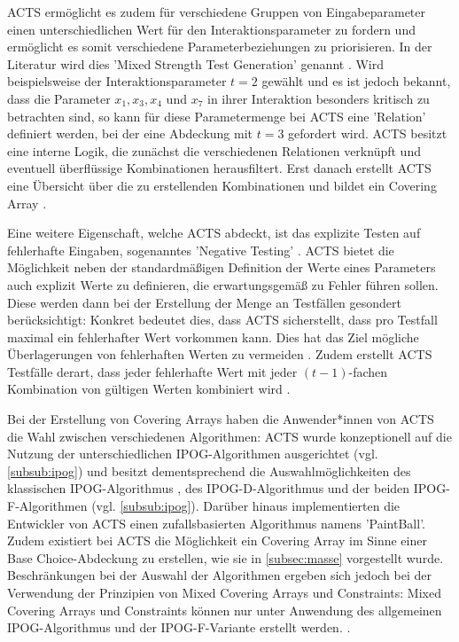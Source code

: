 ACTS ermöglicht es zudem für verschiedene Gruppen von Eingabeparameter einen unterschiedlichen Wert für den Interaktionsparameter zu fordern und ermöglicht es somit verschiedene Parameterbeziehungen zu priorisieren. In der Literatur wird dies 'Mixed Strength Test Generation' genannt \cite{yu2013acts, czerwonka2006pairwise}. Wird beispielsweise der Interaktionsparameter $t = 2$ gewählt und es ist jedoch bekannt, dass die Parameter $x_1, x_3, x_4$ und $x_7$ in ihrer Interaktion besonders kritisch zu betrachten sind, so kann für diese Parametermenge bei ACTS eine 'Relation' \cite{yu2013acts} definiert werden, bei der eine Abdeckung mit $t = 3$ gefordert wird. ACTS besitzt eine interne Logik, die zunächst die verschiedenen Relationen verknüpft und eventuell überflüssige Kombinationen herausfiltert. Erst danach erstellt ACTS eine Übersicht über die zu erstellenden Kombinationen und bildet ein Covering Array \cite{yu2013acts}.

Eine weitere Eigenschaft, welche ACTS abdeckt, ist das explizite Testen auf fehlerhafte Eingaben, sogenanntes 'Negative Testing' \cite{acts_user_guide}. ACTS bietet die Möglichkeit neben der standardmäßigen Definition der Werte eines Parameters auch explizit Werte zu definieren, die erwartungsgemäß zu Fehler führen sollen. Diese werden dann bei der Erstellung der Menge an Testfällen gesondert berücksichtigt: Konkret bedeutet dies, dass ACTS sicherstellt, dass pro Testfall maximal ein fehlerhafter Wert vorkommen kann. Dies hat das Ziel mögliche Überlagerungen von fehlerhaften Werten zu vermeiden \cite{acts_user_guide}. Zudem erstellt ACTS Testfälle derart, dass jeder fehlerhafte Wert mit jeder $(t-1)$-fachen Kombination von gültigen Werten kombiniert wird \cite{acts_user_guide}.
  
Bei der Erstellung von Covering Arrays haben die Anwender*innen von ACTS die Wahl zwischen verschiedenen Algorithmen: ACTS wurde konzeptionell auf die Nutzung der unterschiedlichen IPOG-Algorithmen ausgerichtet (vgl. \autoref{subsub:ipog}) und besitzt dementsprechend die Auswahlmöglichkeiten des klassischen IPOG-Algorithmus \cite{lei2008ipog}, des IPOG-D-Algorithmus \cite{lei2008ipog} und der beiden IPOG-F-Algorithmen \cite{forbes2008refining} (vgl. \autoref{subsub:ipog}). Darüber hinaus implementierten die Entwickler von ACTS einen zufallsbasierten Algorithmus namens 'PaintBall'. Zudem existiert bei ACTS die Möglichkeit ein Covering Array im Sinne einer Base Choice-Abdeckung zu erstellen, wie sie in \autoref{subsec:masse} vorgestellt wurde. Beschränkungen bei der Auswahl der Algorithmen ergeben sich jedoch bei der Verwendung der Prinzipien von Mixed Covering Arrays und Constraints: Mixed Covering Arrays und Constraints können nur unter Anwendung des allgemeinen IPOG-Algorithmus und der IPOG-F-Variante erstellt werden. \cite{acts_user_guide}.

